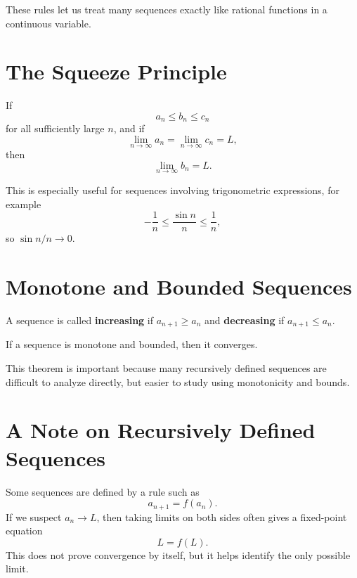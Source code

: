 These rules let us treat many sequences exactly like rational functions in a continuous variable.

\section*{The Squeeze Principle}

If
$$a_n \le b_n \le c_n$$
for all sufficiently large $n$, and if
$$\lim_{n\to\infty} a_n = \lim_{n\to\infty} c_n = L,$$
then
$$\lim_{n\to\infty} b_n = L.$$ 

This is especially useful for sequences involving trigonometric expressions, for example
$$-\frac{1}{n} \le \frac{\sin n}{n} \le \frac{1}{n},$$
so $\sin n/n \to 0$.

\section*{Monotone and Bounded Sequences}

A sequence is called \textbf{increasing} if $a_{n+1}\ge a_n$ and \textbf{decreasing} if $a_{n+1}\le a_n$.

\begin{theorem}
If a sequence is monotone and bounded, then it converges.
\end{theorem}

This theorem is important because many recursively defined sequences are difficult to analyze directly, but easier to study using monotonicity and bounds.

\section*{A Note on Recursively Defined Sequences}

Some sequences are defined by a rule such as
$$a_{n+1}=f(a_n).$$
If we suspect $a_n\to L$, then taking limits on both sides often gives a fixed-point equation
$$L=f(L).$$
This does not prove convergence by itself, but it helps identify the only possible limit.